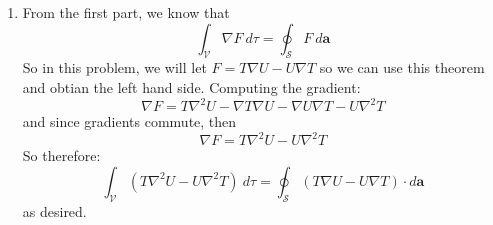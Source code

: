 \documentclass[10pt]{article}
\begin{document}
\begin{solution}
\begin{enumerate}[label=(\alph*)]
            \item From the first part, we know that 
            \[ \int_{\mathcal V} \nabla F \ d\tau = \oint_{\mathcal S} F \ d\mathbf a\]
            So in this problem, we will let $F = T \nabla U - U \nabla T$ so we can use this theorem and obtian the left hand side. Computing the gradient: 
            \[ \nabla F = T \nabla^2 U - \nabla T \nabla U - \nabla U \nabla T - U \nabla^2 T\] 
            and since gradients commute, then 
            \[ \nabla F = T \nabla^2 U - U\nabla^2 T\] 
            So therefore:
            \[ \int_{\mathcal V} (T \nabla^2 U - U \nabla^2 T) \ d\tau = \oint_{\mathcal S}(T \nabla U - U\nabla T) \cdot d\mathbf a\]
            as desired.
        \end{enumerate}
    \end{solution}
\end{document}
